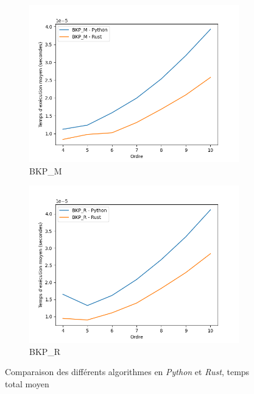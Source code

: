 \documentclass[12pt,a4paper]{article}
\begin{document}
\begin{figure}[ht]
\begin{subfigure}[b]{0.24\textwidth}
    \includegraphics[width=\textwidth]{images/total_new_pyrust_BKP_M_plot.png}
  \caption{BKP\_M}%
  \label{subfig:pr2_bkp_m}
  \end{subfigure}
  \begin{subfigure}[b]{0.24\textwidth}
    \includegraphics[width=\textwidth]{images/total_new_pyrust_BKP_R_plot.png}
  \caption{BKP\_R}%
  \label{subfig:pr2_bkp_r}
  \end{subfigure}
  \caption{Comparaison des différents algorithmes en \emph{Python} et \emph{Rust}, temps total moyen}%
  \label{fig:pvr2}
\end{figure}
\end{document}
